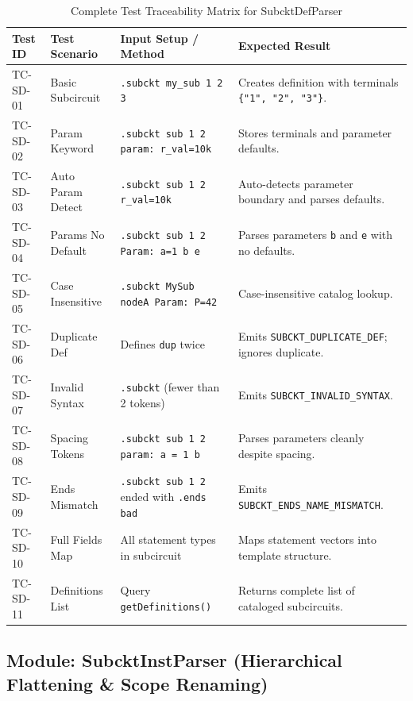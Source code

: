 \begin{table}[H]
\centering
\small
\begin{tabular}{|l|l|p{4.5cm}|p{4.5cm}|}
\hline
\textbf{Test ID} & \textbf{Test Scenario} & \textbf{Input Setup / Method} & \textbf{Expected Result} \\
\hline
TC-SD-01 & Basic Subcircuit & \texttt{.subckt my\_sub 1 2 3} & Creates definition with terminals \texttt{\{"1", "2", "3"\}}. \\
\hline
TC-SD-02 & Param Keyword & \texttt{.subckt sub 1 2 param: r\_val=10k} & Stores terminals and parameter defaults. \\
\hline
TC-SD-03 & Auto Param Detect & \texttt{.subckt sub 1 2 r\_val=10k} & Auto-detects parameter boundary and parses defaults. \\
\hline
TC-SD-04 & Params No Default & \texttt{.subckt sub 1 2 Param: a=1 b e} & Parses parameters \texttt{b} and \texttt{e} with no defaults. \\
\hline
TC-SD-05 & Case Insensitive & \texttt{.subckt MySub nodeA Param: P=42} & Case-insensitive catalog lookup. \\
\hline
TC-SD-06 & Duplicate Def & Defines \texttt{dup} twice & Emits \texttt{SUBCKT\_DUPLICATE\_DEF}; ignores duplicate. \\
\hline
TC-SD-07 & Invalid Syntax & \texttt{.subckt} (fewer than 2 tokens) & Emits \texttt{SUBCKT\_INVALID\_SYNTAX}. \\
\hline
TC-SD-08 & Spacing Tokens & \texttt{.subckt sub 1 2 param: a = 1 b} & Parses parameters cleanly despite spacing. \\
\hline
TC-SD-09 & Ends Mismatch & \texttt{.subckt sub 1 2} ended with \texttt{.ends bad} & Emits \texttt{SUBCKT\_ENDS\_NAME\_MISMATCH}. \\
\hline
TC-SD-10 & Full Fields Map & All statement types in subcircuit & Maps statement vectors into template structure. \\
\hline
TC-SD-11 & Definitions List & Query \texttt{getDefinitions()} & Returns complete list of cataloged subcircuits. \\
\hline
\end{tabular}
\caption{Complete Test Traceability Matrix for SubcktDefParser}
\end{table}


\subsection{Module: SubcktInstParser (Hierarchical Flattening \& Scope Renaming)}

